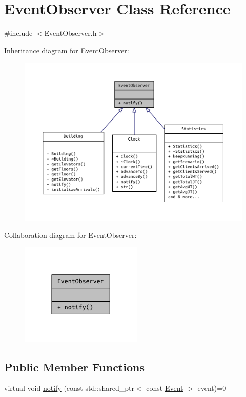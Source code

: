 \hypertarget{class_event_observer}{}\section{Event\+Observer Class Reference}
\label{class_event_observer}


{\ttfamily \#include $<$Event\+Observer.\+h$>$}



Inheritance diagram for Event\+Observer\+:
\nopagebreak
\begin{figure}[H]
\begin{center}
\leavevmode
\includegraphics[width=350pt]{class_event_observer__inherit__graph}
\end{center}
\end{figure}


Collaboration diagram for Event\+Observer\+:
\nopagebreak
\begin{figure}[H]
\begin{center}
\leavevmode
\includegraphics[width=165pt]{class_event_observer__coll__graph}
\end{center}
\end{figure}
\subsection*{Public Member Functions}
\begin{DoxyCompactItemize}
\item 
virtual void \hyperlink{class_event_observer_a81b3c545084ba3c8eaa8c83f5a0a4eb8}{notify} (const std\+::shared\+\_\+ptr$<$ const \hyperlink{class_event}{Event} $>$ event)=0
\end{DoxyCompactItemize}


